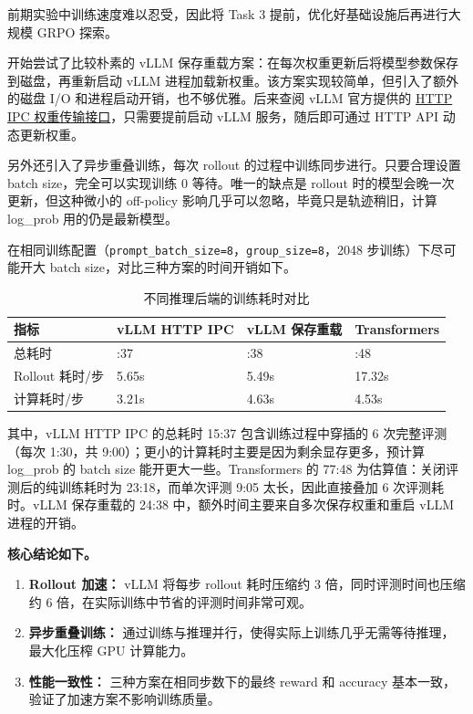 \documentclass[UTF8,a4paper,10pt,twocolumn]{ctexart}
\begin{document}
前期实验中训练速度难以忍受，因此将 Task 3 提前，优化好基础设施后再进行大规模 GRPO 探索。

开始尝试了比较朴素的 vLLM 保存重载方案：在每次权重更新后将模型参数保存到磁盘，再重新启动 vLLM 进程加载新权重。该方案实现较简单，但引入了额外的磁盘 I/O 和进程启动开销，也不够优雅。后来查阅 vLLM 官方提供的 \href{https://docs.vllm.ai/en/latest/training/weight_transfer/ipc/}{HTTP IPC 权重传输接口}，只需要提前启动 vLLM 服务，随后即可通过 HTTP API 动态更新权重。

另外还引入了异步重叠训练，每次 rollout 的过程中训练同步进行。只要合理设置 batch size，完全可以实现训练 0 等待。唯一的缺点是 rollout 时的模型会晚一次更新，但这种微小的 off-policy 影响几乎可以忽略，毕竟只是轨迹稍旧，计算 log\_prob 用的仍是最新模型。

在相同训练配置（\texttt{prompt\_batch\_size=8}，\texttt{group\_size=8}，2048 步训练）下尽可能开大 batch size，对比三种方案的时间开销如下。

\begin{table}[t]
  \centering
  \caption{不同推理后端的训练耗时对比}
  \begin{tabularx}{\textwidth}{>{\centering\arraybackslash}p{3.2cm} >{\centering\arraybackslash}X >{\centering\arraybackslash}X >{\centering\arraybackslash}X}
    \toprule
    指标 & vLLM HTTP IPC & vLLM 保存重载 & Transformers \\
    \midrule
    总耗时 & 15:37 & 24:38 & 77:48 \\
    Rollout 耗时/步 & 5.65s & 5.49s & 17.32s \\
    计算耗时/步 & 3.21s & 4.63s & 4.53s \\
    \bottomrule
  \end{tabularx}
\end{table}

其中，vLLM HTTP IPC 的总耗时 15:37 包含训练过程中穿插的 6 次完整评测（每次 1:30，共 9:00）；更小的计算耗时主要是因为剩余显存更多，预计算 log\_prob 的 batch size 能开更大一些。Transformers 的 77:48 为估算值：关闭评测后的纯训练耗时为 23:18，而单次评测 9:05 太长，因此直接叠加 6 次评测耗时。vLLM 保存重载的 24:38 中，额外时间主要来自多次保存权重和重启 vLLM 进程的开销。

\textbf{核心结论如下。}
\begin{enumerate}
  \item \textbf{Rollout 加速：} vLLM 将每步 rollout 耗时压缩约 3 倍，同时评测时间也压缩约 6 倍，在实际训练中节省的评测时间非常可观。
  \item \textbf{异步重叠训练：} 通过训练与推理并行，使得实际上训练几乎无需等待推理，最大化压榨 GPU 计算能力。
  \item \textbf{性能一致性：} 三种方案在相同步数下的最终 reward 和 accuracy 基本一致，验证了加速方案不影响训练质量。
\end{enumerate}
\end{document}
